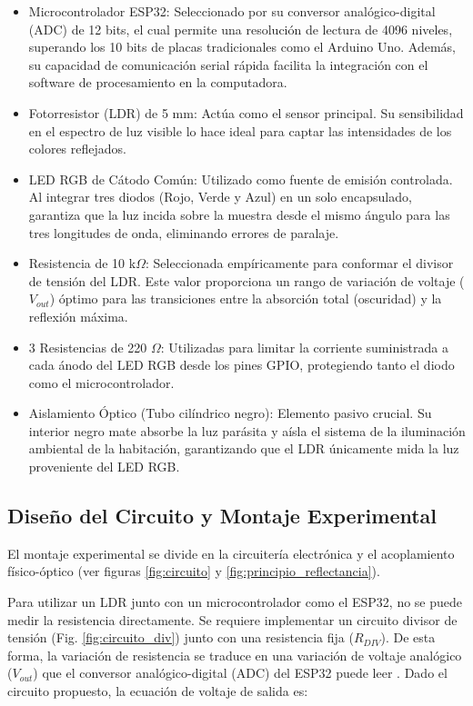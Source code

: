\documentclass[conference]{IEEEtran}
\begin{document}
\begin{itemize}
    \item Microcontrolador ESP32: Seleccionado por su conversor analógico-digital (ADC) de 12 bits, el cual permite una resolución de lectura de 4096 niveles, superando los 10 bits de placas tradicionales como el Arduino Uno. Además, su capacidad de comunicación serial rápida facilita la integración con el software de procesamiento en la computadora.
    \item Fotorresistor (LDR) de 5 mm: Actúa como el sensor principal. Su sensibilidad en el espectro de luz visible lo hace ideal para captar las intensidades de los colores reflejados.
    \item LED RGB de Cátodo Común: Utilizado como fuente de emisión controlada. Al integrar tres diodos (Rojo, Verde y Azul) en un solo encapsulado, garantiza que la luz incida sobre la muestra desde el mismo ángulo para las tres longitudes de onda, eliminando errores de paralaje.
    \item Resistencia de 10 k$\Omega$: Seleccionada empíricamente para conformar el divisor de tensión del LDR. Este valor proporciona un rango de variación de voltaje ($V_{out}$) óptimo para las transiciones entre la absorción total (oscuridad) y la reflexión máxima.
    \item 3 Resistencias de 220 $\Omega$: Utilizadas para limitar la corriente suministrada a cada ánodo del LED RGB desde los pines GPIO, protegiendo tanto el diodo como el microcontrolador.
    \item Aislamiento Óptico (Tubo cilíndrico negro): Elemento pasivo crucial. Su interior negro mate absorbe la luz parásita y aísla el sistema de la iluminación ambiental de la habitación, garantizando que el LDR únicamente mida la luz proveniente del LED RGB.
\end{itemize}

\subsection{Diseño del Circuito y Montaje Experimental}
El montaje experimental se divide en la circuitería electrónica y el acoplamiento físico-óptico (ver figuras \ref{fig:circuito} y \ref{fig:principio_reflectancia}).

Para utilizar un LDR junto con un microcontrolador como el ESP32, no se puede medir la resistencia directamente. Se requiere implementar un circuito divisor de tensión (Fig. \ref{fig:circuito_div}) junto con una resistencia fija ($R_{DIV}$). De esta forma, la variación de resistencia se traduce en una variación de voltaje analógico ($V_{out}$) que el conversor analógico-digital (ADC) del ESP32 puede leer \cite{ldr_10}. Dado el circuito propuesto, la ecuación de voltaje de salida es:
\end{document}
